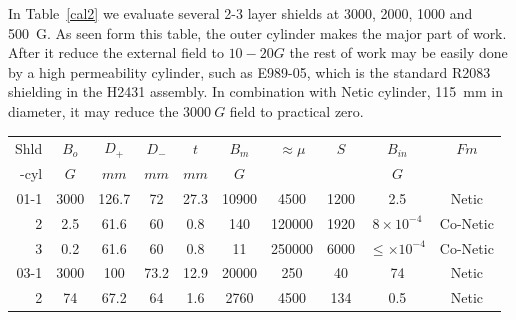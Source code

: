 \documentclass[12pt]{article}
\begin{document}
In Table~\ref{cal2} we evaluate several 2-3 layer  shields 
at 3000, 2000, 1000 and 500~G. As seen form  this table,  
the outer cylinder makes the major part of work. 
After it reduce the external field  to $10-20G$ the rest of work may  
be easily done  by a high permeability
cylinder, such as E989-05, which is the standard R2083 shielding in the H2431 
assembly. In combination with Netic cylinder, 115~mm in diameter,  it may 
reduce the $3000~G$ field to practical zero.

%
\begin{table}[htbp]
\begin{center}
\begin{tabular}{|r|c|c|c|c|c|c|c|c|c|} \hline
  Shld&$B_{o}$&$D_+$&$D_-$&$t$   &$B_m$  &$\approx\mu$&$S$   &$B_{in}$         & $Fm$    \\
  -cyl&  $G$  &$mm$ &$mm$ &$mm$  &$G$   &            &      &$G$            &          \\ \hline 
01-1    &3000 & 126.7 & 72  & 27.3   & 10900 & 4500       & 1200 & 2.5             & Netic    \\ \hline
 2    &2.5  &61.6 &  60 & 0.8  & 140   & 120000     & 1920 &$8\times10^{-4}$  & Co-Netic \\ \hline
 3    &0.2  &61.6 &  60 & 0.8  & 11    & 250000     & 6000 &$\leq\times10^{-4}$& Co-Netic \\ \hline\hline  
03-1    & 3000& 100 &  73.2 & 12.9  &20000 & 250        & 40 &  74           & Netic \\ \hline
 2    & 74 & 67.2  &64 & 1.6  &  2760 & 4500       & 134  &  0.5            & Netic       \\ \hline

\end{tabular}
\end{center}
\end{table}
\end{document}
